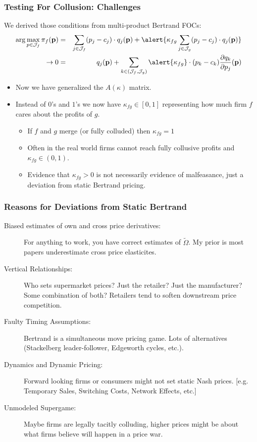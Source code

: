 \documentclass[xcolor=pdftex,dvipsnames,table,mathserif,aspectratio=169]{beamer}
\begin{document}
\begin{frame}
\frametitle{Testing For Collusion: Challenges}
We derived those conditions from multi-product Bertrand FOCs:
\begin{eqnarray*}
\arg \max_{p \in \mathcal{J}_f} \pi_f (\mathbf{p}) &=& \sum_{j \in \mathcal{J}_f} (p_j - c_j) \cdot q_j(\mathbf{p}) +  \alert{\kappa_{fg} \sum_{j \in \mathcal{J}_g} (p_j - c_j) \cdot q_j(\mathbf{p})} \\
\rightarrow 0&=& q_j(\mathbf{p}) + \sum_{k \in (\mathcal{J}_f,\mathcal{J}_g)} \alert{\kappa_{fg}}\cdot (p_k - c_k) \frac{\partial q_{k}}{\partial p_j}(\mathbf{p}) 
\end{eqnarray*}
\begin{itemize}
\item Now we have generalized the $A(\kappa)$ matrix.
\item Instead of $0$'s and $1$'s we now have $\kappa_{fg} \in [0,1]$ representing how much firm $f$ cares about the profits of $g$.
\begin{itemize}
\item If $f$ and $g$ merge (or fully colluded) then $\kappa_{fg} =1$
\item Often in the real world firms cannot reach fully collusive profits and $\kappa_{fg} \in (0,1)$.
\item Evidence that $\kappa_{fg} > 0$ is not necessarily evidence of malfeasance, just a deviation from \alert{static Bertrand pricing}.
\end{itemize}
\end{itemize}
\end{frame}

\begin{frame}
\frametitle{Reasons for Deviations from Static Bertrand}
\small
\begin{description}
\item[Biased estimates of own and cross price derivatives:] For anything to work, you have correct estimates of $\tilde{\Omega}$. My prior is most papers \alert{underestimate} cross price elasticites.
\item[Vertical Relationships:] Who sets supermarket prices? Just the retailer? Just the manufacturer? Some combination of both? Retailers tend to \alert{soften} downstream price competition.
\item[Faulty Timing Assumptions:] Bertrand is a simultaneous move pricing game. Lots of alternatives (Stackelberg leader-follower, Edgeworth cycles, etc.).
\item[Dynamics and Dynamic Pricing:] Forward looking firms or consumers might not set static Nash prices. [e.g. Temporary Sales, Switching Costs, Network Effects, etc.]
\item[Unmodeled Supergame:] Maybe firms are legally tacitly colluding, higher prices might be about what firms believe will happen in a price war.
\end{description}
\end{frame}
\end{document}
